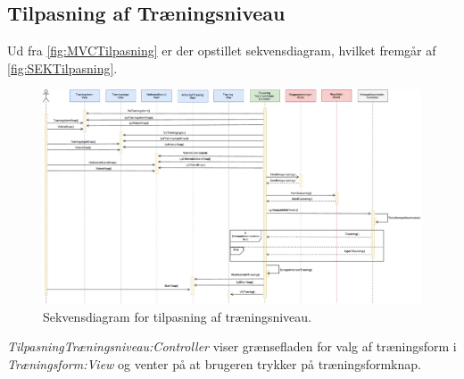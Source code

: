 \subsection*{Tilpasning af Træningsniveau}
Ud fra \autoref{fig:MVCTilpasning} er der opstillet sekvensdiagram, hvilket fremgår af \autoref{fig:SEKTilpasning}. 

\begin{figure} [H]
\centering
\includegraphics[width=1\textwidth]{figures/Sek/SEKTilpasning}
\caption{Sekvensdiagram for tilpasning af træningsniveau.}
\label{fig:SEKTilpasning}
\end{figure}

\noindent
\textit{TilpasningTræningsniveau:Controller} viser grænsefladen for valg af træningsform i \textit{Træningsform:View} og venter på at brugeren trykker på træningsformknap. 